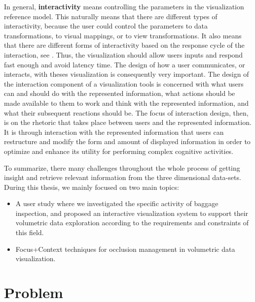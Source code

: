 In general, \textbf{interactivity} means controlling the parameters in the visualization reference model. This naturally means that there are different types of interactivity, because the user could control the parameters to data transformations, to visual mappings, or to view transformations. It also means that there are different forms of interactivity based on the response cycle of the interaction, see \cite{jacko2012human}. Thus, the visualization should allow users inputs and respond fast enough and avoid latency time. The design of how a user communicates, or interacts, with theses visualization is consequently very important. The design of the interaction component of a visualization tools is  concerned with what users can and should do with the represented information, what actions should be made available to them to work and think with the represented information, and what their subsequent reactions should be. The focus of interaction design, then, is on the rhetoric that takes place between users and the represented information. It is through interaction with the represented information that users can restructure and modify the form and amount of displayed information in order to optimize and enhance its utility for performing complex cognitive activities.

     
To summarize, there many challenges throughout the whole process of getting insight and retrieve relevant information from the three dimensional data-sets.  
During this thesis, we mainly focused on two main topics: 

\begin{itemize}

\item A user study where we investigated the specific activity of baggage inspection, and proposed an interactive visualization system to support their volumetric data exploration according to the requirements and constraints of this field. 

\item Focus+Context techniques for occlusion management in volumetric data visualization.

\end{itemize}


 
 \section{Problem}
 \label{problem}
 

